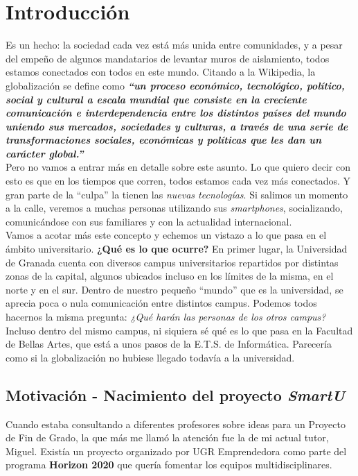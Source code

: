 \chapter{Introducción}
\label{ch:introduccion}
Es un hecho: la sociedad cada vez está más unida entre comunidades, y a pesar del empeño de algunos mandatarios de levantar muros de aislamiento, todos estamos conectados con todos en este mundo. Citando a la Wikipedia, la globalización \cite{globalizacion} se define como \textbf{\textit{``un proceso económico, tecnológico, político, social y cultural a escala mundial que consiste en la creciente comunicación e interdependencia entre los distintos países del mundo uniendo sus mercados, sociedades y culturas, a través de una serie de transformaciones sociales, económicas y políticas que les dan un carácter global.''}}\\

Pero no vamos a entrar más en detalle sobre este asunto. Lo que quiero decir con esto es que en los tiempos que corren, todos estamos cada vez más conectados. Y gran parte de la ``culpa'' la tienen las \textit{nuevas tecnologías}. Si salimos un momento a la calle, veremos a muchas personas utilizando sus \textit{smartphones}, socializando, comunicándose con sus familiares y con la actualidad internacional.\\

Vamos a acotar más este concepto y echemos un vistazo a lo que pasa en el ámbito universitario. \textbf{¿Qué es lo que ocurre?} En primer lugar, la Universidad de Granada cuenta con diversos campus universitarios repartidos por distintas zonas de la capital, algunos ubicados incluso en los límites de la misma, en el norte y en el sur. Dentro de nuestro pequeño ``mundo'' que es la universidad, se aprecia poca o nula comunicación entre distintos campus. Podemos todos hacernos la misma pregunta: \textit{¿Qué harán las personas de los otros campus?}\\

Incluso dentro del mismo campus, ni siquiera sé qué es lo que pasa en la Facultad de Bellas Artes, que está a unos pasos de la E.T.S. de Informática. Parecería como si la globalización no hubiese llegado todavía a la universidad.

\section{Motivación - Nacimiento del proyecto \textit{SmartU}}
Cuando estaba consultando a diferentes profesores sobre ideas para un Proyecto de Fin de Grado, la que más me llamó la atención fue la de mi actual tutor, Miguel. Existía un proyecto organizado por UGR Emprendedora \cite{ugremprende} como parte del programa \textbf{Horizon 2020} \cite{h2020} que quería fomentar los equipos multidisciplinares.\\

